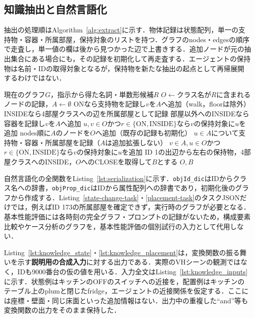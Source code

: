 \subsection{知識抽出と自然言語化}\label{app:knowledge}
抽出の処理順はAlgorithm~\ref{alg:extract}に示す．物体記録は状態配列，単一の支持物・容器・所属部屋，保持対象のリストを持つ．グラフのnodes・edgesの順序で走査し，単一値の欄は後から見つかった辺で上書きする．追加ノードが元の抽出集合にある場合にも，その記録を初期化して再走査する．エージェントの保持物は名前・IDの取得対象となるが，保持物を新たな抽出の起点として再帰展開するわけではない．

\begin{algorithm*}[tb]
\caption{公開コードの知識抽出}\label{alg:extract}
\begin{algorithmic}[1]
\Require 現在のグラフ$G$，指示から得た名詞・単数形候補$R$
\State $O\gets$クラス名が$R$に含まれるノードの記録，$A\gets\emptyset$
    \State ONなら支持物を記録し$v$を$A$へ追加（walk，floorは除外）
    \State INSIDEなら4部屋クラスへの辺を所属部屋として記録
    \State 部屋以外へのINSIDEなら容器を記録し$v$を$A$へ追加
  \EndIf
  \State $u,v\in O$かつ$r\in\{\mathrm{ON},\mathrm{INSIDE}\}$なら$v$の保持対象に$u$を追加
\EndFor
\State nodes順に$A$のノードを$O$へ追加（既存の記録も初期化）
  \State $u\in A$について支持物・容器・所属部屋を記録（$A$は追加拡張しない）
  \State $v\in A,u\in O$かつ$r\in\{\mathrm{ON},\mathrm{INSIDE}\}$なら$v$の保持対象に$u$を追加
\EndFor
\State ID 1の出辺から左右の保持物，4部屋クラスへのINSIDE，$O$へのCLOSEを取得して$B$とする
\State \Return $O,B$
\end{algorithmic}
\end{algorithm*}

自然言語化の全関数をListing~\ref{lst:serialization}に示す．\texttt{objId\_dic}はIDからクラス名への辞書，\texttt{objProp\_dic}はIDから属性配列への辞書であり，初期化後のグラフから作成する．Listing~\ref{state-change-task}・\ref{placement-task}のタスクJSONだけでは，例えばID 173の所属部屋を確定できず，実行時のグラフが必要となる．基本性能評価には各時刻の完全グラフ・プロンプトの記録がないため，構成要素比較やケース分析のグラフを，基本性能評価の個別試行の入力として代用しない．

Listing~\ref{lst:knowledge_state}・\ref{lst:knowledge_placement}は，変換関数の振る舞いを示す\textbf{説明用の合成入力}に対する出力である．実際のVHシーンの観測ではなく，IDも9000番台の仮の値を用いる．入力全文はListing~\ref{lst:knowledge_inputs}に示す．状態例はキッチンのOFFのスイッチへの近接を，配置例はキッチンのテーブル上のplumと閉じたfridge，エージェントの近接関係を仮定する．ここには座標・壁面・同じ床面といった追加情報はない．出力中の重複した``and''等も変換関数の出力をそのまま保持した．

